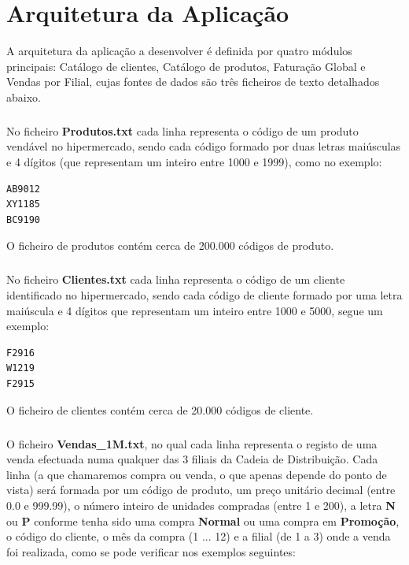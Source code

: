 \chapter{Arquitetura da Aplicação}

A arquitetura da aplicação a desenvolver é definida por quatro módulos principais: Catálogo de clientes, Catálogo de produtos, Faturação Global e Vendas por Filial, cujas fontes de dados são três ficheiros de texto detalhados abaixo.
 
\paragraph{}
No ficheiro \textbf{Produtos.txt} cada linha representa o código de um produto vendável no hipermercado, sendo cada código formado por duas letras maiúsculas e 4 dígitos (que representam um inteiro entre 1000 e 1999), como no exemplo: 

\begin{verbatim}
AB9012
XY1185
BC9190
\end{verbatim}

O ficheiro de produtos contém cerca de 200.000 códigos de produto. 

\paragraph{}
No ficheiro \textbf{Clientes.txt} cada linha representa o código de um cliente identificado no hipermercado, sendo cada código de cliente formado por uma letra maiúscula e 4 dígitos que representam um inteiro entre 1000 e 5000, segue um exemplo: 

\begin{Verbatim}
F2916
W1219
F2915
\end{Verbatim}

O ficheiro de clientes contém cerca de 20.000 códigos de cliente. 

\paragraph{}
O ficheiro \textbf{Vendas\_1M.txt}, no qual cada linha representa o registo de uma venda efectuada numa qualquer das 3 filiais da Cadeia de Distribuição. Cada linha (a que chamaremos compra ou venda, o que apenas depende do ponto de vista) será formada por um código de produto, um preço unitário decimal (entre 0.0 e 999.99), o número inteiro de unidades compradas (entre 1 e 200), a letra \textbf{N} ou \textbf{P} conforme tenha sido uma compra \textbf{Normal} ou uma compra em \textbf{Promoção}, o código do cliente, o mês da compra (1 ... 12) e a filial (de 1 a 3) onde a venda foi realizada, como se pode verificar nos exemplos seguintes:
 
